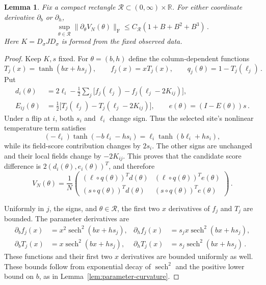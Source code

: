 \documentclass[11pt]{amsart}
\numberwithin{equation}{section}
\newtheorem{lemma}[theorem]{Lemma}
\theoremstyle{remark}
\newcommand{\R}{\mathbb R}
\newcommand{\sech}{\operatorname{sech}}
\newcommand{\Frob}{\mathrm{F}}
\begin{document}
\begin{lemma}\label{lem:parameter-V}
Fix a compact rectangle $\mathcal R\subset(0,\infty)\times\R$. For either coordinate derivative $\partial_b$ or $\partial_h$,
\begin{equation}
 \sup_{\theta\in\mathcal R}\|\partial_\theta V_N(\theta)\|_\Frob
 \le C_{\mathcal R}(1+B+B^2+B^3)\,.
 \label{eq:V-lipschitz}
\end{equation}
Here $K=D_\sigma JD_\sigma$ is formed from the fixed observed data.
\end{lemma}
\begin{proof}
Keep $K,s$ fixed. For $\theta=(b,h)$ define the column-dependent functions
\begin{equation*}
 T_j(x)=\tanh(bx+hs_j),\qquad f_j(x)=xT_j(x),\qquad q_j(\theta)=1-T_j(\ell_j)\,.
\end{equation*}
Put
\begin{align}
 d_i(\theta)
 &=2\ell_i-\frac12\sum_j
 \bigl[f_j(\ell_j)-f_j(\ell_j-2K_{ij})\bigr],
 \label{eq:candidate-d}\\
 E_{ij}(\theta)
 &=\frac12\bigl[T_j(\ell_j)-T_j(\ell_j-2K_{ij})\bigr],
 \qquad e(\theta)=(I-E(\theta))s\,.
 \label{eq:candidate-E}
\end{align}
Under a flip at $i$, both $s_i$ and $\ell_i$ change sign. Thus the selected site's nonlinear temperature term satisfies
\begin{equation*}
 (-\ell_i)\tanh(-b\ell_i-hs_i)=\ell_i\tanh(b\ell_i+hs_i),
\end{equation*}
while its field-score contribution changes by $2s_i$. The other signs are unchanged and their local fields change by $-2K_{ij}$. This proves that the candidate score difference is $2(d_i(\theta),e_i(\theta))^T$, and therefore
\begin{equation}
 V_N(\theta)=\frac1N
 \begin{pmatrix}
 (\ell\circ q(\theta))^Td(\theta)&(\ell\circ q(\theta))^Te(\theta)\\
 (s\circ q(\theta))^Td(\theta)&(s\circ q(\theta))^Te(\theta)
 \end{pmatrix}\,.
 \label{eq:candidate-V-gauge}
\end{equation}

Uniformly in $j$, the signs, and $\theta\in\mathcal R$, the first two $x$ derivatives of $f_j$ and $T_j$ are bounded. The parameter derivatives are
\begin{align*}
 \partial_b f_j(x)&=x^2\sech^2(bx+hs_j),
 &\partial_h f_j(x)&=s_jx\sech^2(bx+hs_j),\\
 \partial_b T_j(x)&=x\sech^2(bx+hs_j),
 &\partial_h T_j(x)&=s_j\sech^2(bx+hs_j)\,.
\end{align*}
These functions and their first two $x$ derivatives are bounded uniformly as well. These bounds follow from exponential decay of $\sech^2$ and the positive lower bound on $b$, as in Lemma~\ref{lem:parameter-curvature}.


\end{proof}
\end{document}
